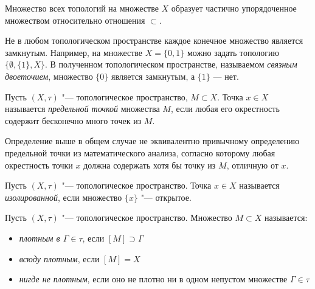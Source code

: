 \begin{note}
	Множество всех топологий на множестве $X$ образует частично упорядоченное множеством относительно отношения $\subset$.
\end{note}

\begin{note}
	Не в любом топологическом пространстве каждое конечное множество является замкнутым. Например, на множестве $X = \{ 0, 1\}$ можно задать топологию $\{\emptyset, \{1\}, X\}$. В полученном топологическом пространстве, называемом \emph{связным двоеточием}, множество $\{0\}$ является замкнутым, а $\{1\}$ --- нет.
\end{note}

\begin{definition}
	Пусть $(X, \tau)$ "--- топологическое пространство, $M \subset X$. Точка ${x \in X}$ называется \textit{предельной точкой} множества $M$, если любая его окрестность содержит бесконечно много точек из $M$.
\end{definition}

\begin{note}
	Определение выше в общем случае не эквивалентно привычному определению предельной точки из математического анализа, согласно которому любая окрестность точки $x$ должна содержать хотя бы точку из $M$, отличную от $x$.
\end{note}

\begin{definition}
	Пусть $(X, \tau)$ "--- топологическое пространство. Точка $x \in X$ называется \textit{изолированной}, если множество $\{x\}$ "--- открытое.
\end{definition}

\begin{definition}
	Пусть $(X, \tau)$ "--- топологическое пространство. Множество $M \subset X$ называется:
	\begin{itemize}
		\item \textit{плотным в $\Gamma \in \tau$}, если $[M] \supset \Gamma$
		\item \textit{всюду плотным}, если $[M] = X$
		\item \textit{нигде не плотным}, если оно не плотно ни в одном непустом множестве $\Gamma \in \tau$
	\end{itemize}
\end{definition}

